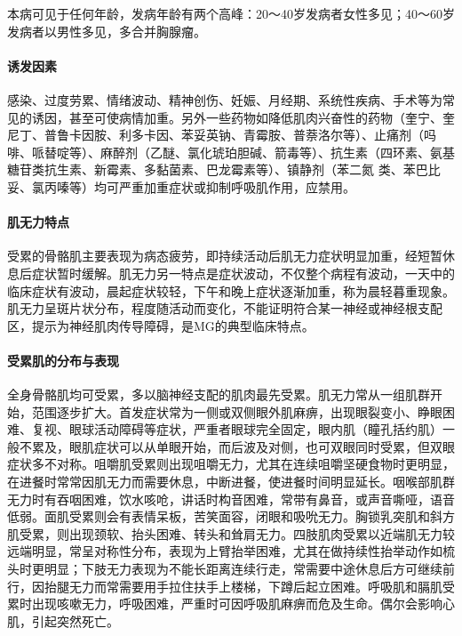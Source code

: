 本病可见于任何年龄，发病年龄有两个高峰：20～40岁发病者女性多见；40～60岁发病者以男性多见，多合并胸腺瘤。

\paragraph{诱发因素}

感染、过度劳累、情绪波动、精神创伤、妊娠、月经期、系统性疾病、手术等为常见的诱因，甚至可使病情加重。另外一些药物如降低肌肉兴奋性的药物（奎宁、奎尼丁、普鲁卡因胺、利多卡因、苯妥英钠、青霉胺、普萘洛尔等）、止痛剂（吗啡、哌替啶等）、麻醉剂（乙醚、氯化琥珀胆碱、箭毒等）、抗生素（四环素、氨基糖苷类抗生素、新霉素、多黏菌素、巴龙霉素等）、镇静剂（苯二氮{}
类、苯巴比妥、氯丙嗪等）均可严重加重症状或抑制呼吸肌作用，应禁用。

\paragraph{肌无力特点}

受累的骨骼肌主要表现为病态疲劳，即持续活动后肌无力症状明显加重，经短暂休息后症状暂时缓解。肌无力另一特点是症状波动，不仅整个病程有波动，一天中的临床症状有波动，晨起症状较轻，下午和晚上症状逐渐加重，称为晨轻暮重现象。肌无力呈斑片状分布，程度随活动而变化，不能证明符合某一神经或神经根支配区，提示为神经肌肉传导障碍，是MG的典型临床特点。

\paragraph{受累肌的分布与表现}

全身骨骼肌均可受累，多以脑神经支配的肌肉最先受累。肌无力常从一组肌群开始，范围逐步扩大。首发症状常为一侧或双侧眼外肌麻痹，出现眼裂变小、睁眼困难、复视、眼球活动障碍等症状，严重者眼球完全固定，眼内肌（瞳孔括约肌）一般不累及，眼肌症状可以从单眼开始，而后波及对侧，也可双眼同时受累，但双眼症状多不对称。咀嚼肌受累则出现咀嚼无力，尤其在连续咀嚼坚硬食物时更明显，在进餐时常常因肌无力而需要休息，中断进餐，使进餐时间明显延长。咽喉部肌群无力时有吞咽困难，饮水咳呛，讲话时构音困难，常带有鼻音，或声音嘶哑，语音低弱。面肌受累则会有表情呆板，苦笑面容，闭眼和吸吮无力。胸锁乳突肌和斜方肌受累，则出现颈软、抬头困难、转头和耸肩无力。四肢肌肉受累以近端肌无力较远端明显，常呈对称性分布，表现为上臂抬举困难，尤其在做持续性抬举动作如梳头时更明显；下肢无力表现为不能长距离连续行走，常需要中途休息后方可继续前行，因抬腿无力而常需要用手拉住扶手上楼梯，下蹲后起立困难。呼吸肌和膈肌受累时出现咳嗽无力，呼吸困难，严重时可因呼吸肌麻痹而危及生命。偶尔会影响心肌，引起突然死亡。

